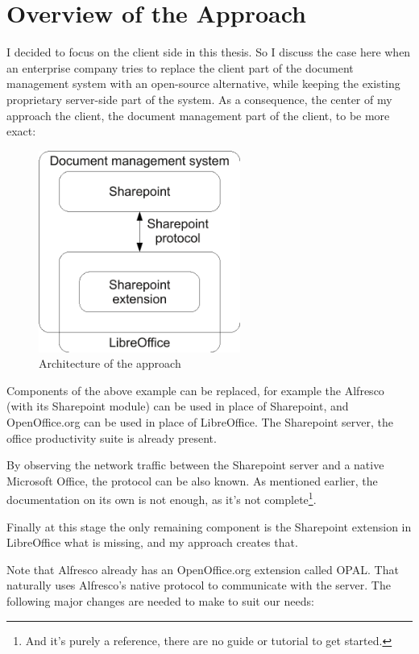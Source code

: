 \section{Overview of the Approach}

I decided to focus on the client side in this thesis. So I discuss the case
here when an enterprise company tries to replace the client part of the
document management system with an open-source alternative, while keeping the
existing proprietary server-side part of the system. As a consequence, the
center of my approach the client, the document management part of the client,
to be more exact:

\begin{figure}[H]
\centering
\includegraphics[width=250px,keepaspectratio]{overview-architecture.pdf}
\caption{Architecture of the approach}
\end{figure}

Components of the above example can be replaced, for example the Alfresco (with
its Sharepoint module) can be used in place of Sharepoint, and OpenOffice.org
can be used in place of LibreOffice. The Sharepoint server, the office
productivity suite is already present.

By observing the network traffic between the Sharepoint server and a native
Microsoft Office, the protocol can be also known. As mentioned earlier, the
documentation on its own is not enough, as it's not complete\footnote{And it's
purely a reference, there are no guide or tutorial to get started.}.

Finally at this stage the only remaining component is the Sharepoint extension
in LibreOffice what is missing, and my approach creates that.

Note that Alfresco already has an OpenOffice.org extension called
OPAL\cite{opal}. That naturally uses Alfresco's native protocol to communicate
with the server. The following major changes are needed to make to suit our
needs:

